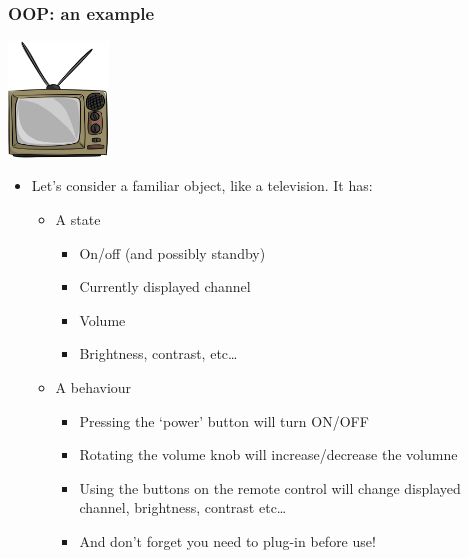 \documentclass[9pt]{beamer}
\begin{document}
\begin{frame}
  \frametitle{OOP: an example}
  \centering\includegraphics[width=0.2\textwidth]{television.png}
  
  \medskip
  
  \begin{itemize}
  \item Let's consider a familiar object, like a television. It has:
    \smallskip
    \begin{itemize}
    \item A state
      \begin{itemize}
      \item On/off (and possibly standby)
      \item Currently displayed channel
      \item Volume
      \item Brightness, contrast, etc\dots
      \end{itemize}

    \medskip
    
    \item A behaviour
      \smallskip
      \begin{itemize}
      \item Pressing the `power' button will turn ON/OFF
      \item Rotating the volume knob will increase/decrease the volumne
      \item Using the buttons on the remote control will change displayed 
            channel, brightness, contrast etc\dots
      \item And don't forget you need to plug-in before use!
      \end{itemize}
    \end{itemize}
  \end{itemize}

\end{frame}
\end{document}
